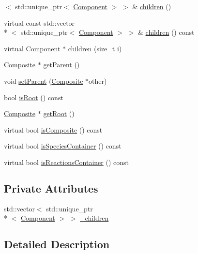 \begin{DoxyCompactItemize}
$<$ std\-::unique\-\_\-ptr$<$ \hyperlink{classchem_1_1Component}{Component} $>$ $>$ \& \hyperlink{classchem_1_1Composite_af4fdad429dc7d8d5014961bbd18c8970}{children} ()
\item 
virtual const std\-::vector\\*
$<$ std\-::unique\-\_\-ptr$<$ \hyperlink{classchem_1_1Component}{Component} $>$ $>$ \& \hyperlink{classchem_1_1Composite_a9c66ed039e22fdafc90627db067fea4b}{children} () const 
\item 
virtual \hyperlink{classchem_1_1Component}{Component} $\ast$ \hyperlink{classchem_1_1Composite_adf797cd6faed6b5f42848c712fd9eb8a}{children} (size\-\_\-t i)
\item 
\hyperlink{classchem_1_1Composite}{Composite} $\ast$ \hyperlink{classchem_1_1Component_a32812270ee52f07ceae2194c56864fd6}{get\-Parent} ()
\item 
void \hyperlink{classchem_1_1Component_a1f4e4d1566f1d3026f1e2a14fa3dffd9}{set\-Parent} (\hyperlink{classchem_1_1Composite}{Composite} $\ast$other)
\item 
bool \hyperlink{classchem_1_1Component_a75cd13a0d884f82fcddd574de33fbfe6}{is\-Root} () const 
\item 
\hyperlink{classchem_1_1Composite}{Composite} $\ast$ \hyperlink{classchem_1_1Component_a7f1166f8fb4c9526cd1794ec3c2714f5}{get\-Root} ()
\item 
virtual bool \hyperlink{classchem_1_1Component_af2c73f75f937d457a55c1e0120833cb8}{is\-Composite} () const 
\item 
virtual bool \hyperlink{classchem_1_1Component_a3c0f652fe5b6910f07c046fe0190b7b5}{is\-Species\-Container} () const 
\item 
virtual bool \hyperlink{classchem_1_1Component_a8c79ee4335fadfcef56b14a62b742457}{is\-Reactions\-Container} () const 
\end{DoxyCompactItemize}
\subsection*{Private Attributes}
\begin{DoxyCompactItemize}
\item 
std\-::vector$<$ std\-::unique\-\_\-ptr\\*
$<$ \hyperlink{classchem_1_1Component}{Component} $>$ $>$ \hyperlink{classchem_1_1Composite_a80fea5cefad1820315fbef6f8d7adf17}{\-\_\-children}
\end{DoxyCompactItemize}


\subsection{Detailed Description}


